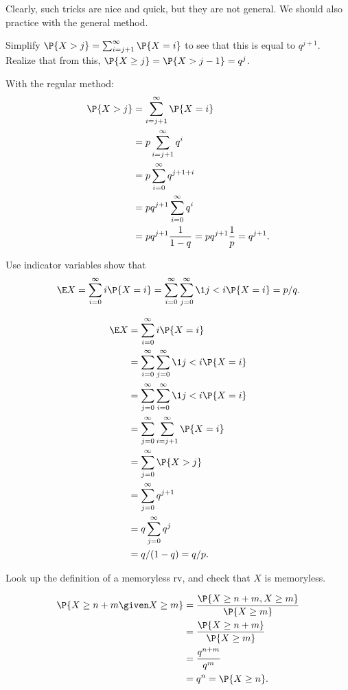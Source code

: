 \documentclass[a4paper]{article}
\begin{document}
Clearly, such tricks are nice and quick, but they are not general. We should also practice with the general method.

\begin{exercise}
Simplify \(\P{X>j}= \sum_{i=j+1}^{\infty} \P{X=i}\) to see that this is equal to \(q^{j+1}\).
Realize that from this, \(\P{X\geq j}  = \P{X>j-1} = q^{j}\).
\begin{solution}
With the regular method:
  \begin{align*}
\P{X>j}
&= \sum_{i=j+1}^{\infty} \P{X=i} \\
&= p\sum_{i=j+1}^{\infty} q^{i} \\
&= p\sum_{i=0}^{\infty} q^{j+1+i} \\
&= pq^{j+1}\sum_{i=0}^{\infty} q^{i} \\
&= pq^{j+1}\frac 1 {1-q} =
p q^{j+1} \frac 1 p = q^{j+1}.
  \end{align*}
\end{solution}
\end{exercise}


\begin{exercise}
Use indicator variables show that
  \begin{equation*}
\E X
= \sum_{i=0}^{\infty} i\P{X=i}
=  \sum_{i=0}^{\infty} \sum_{j=0}^{\infty} \1{j<i} \P{X=i} =p/q.
\end{equation*}
\begin{solution}
  \begin{align*}
\E X
&= \sum_{i=0}^{\infty} i\P{X=i} \\
&=  \sum_{i=0}^{\infty} \sum_{j=0}^{\infty} \1{j<i} \P{X=i} \\
&=  \sum_{j=0}^{\infty} \sum_{i=0}^{\infty} \1{j<i} \P{X=i} \\
&=  \sum_{j=0}^{\infty} \sum_{i=j+1}^{\infty}  \P{X=i} \\
&=  \sum_{j=0}^{\infty}  \P{X>j} \\
&=  \sum_{j=0}^{\infty}  q^{j+1}\\
&=  q \sum_{j=0}^{\infty}  q^{j}\\
&=  q/(1-q) = q/p.
  \end{align*}
\end{solution}
\label{ex:12}
\end{exercise}

\begin{exercise}
Look up the definition of a memoryless rv, and check that \(X\) is memoryless.
\begin{solution}
  \begin{align*}
\P{X\geq n+m\given X\geq m}
&= \frac{ \P{X\geq n+m,  X\geq m}}{\P{X\geq m}} \\
&= \frac{ \P{X\geq n+m}}{\P{X\geq m}} \\
&= \frac{ q^{n+m}}{q^m} \\
&= q^n= \P{X\geq n}.
  \end{align*}
\end{solution}
\end{exercise}
\end{document}
